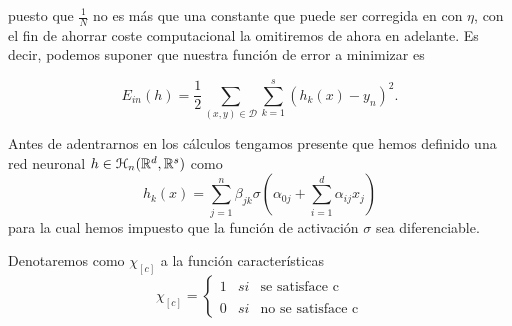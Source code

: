 puesto que $\frac{1}{N}$ no es más que una constante que 
puede ser corregida en  con $\eta$, con el fin de ahorrar coste computacional la 
omitiremos de ahora en adelante. Es decir, podemos suponer que 
nuestra función de error a minimizar es 

\begin{equation}
    E_{in}(h) = \frac{1}{2} \sum_{(x,y) \in \mathcal{D}} \sum_{k=1}^s (h_k(x)- y_n)^2. 
\end{equation}

Antes de adentrarnos en los cálculos tengamos presente que hemos definido una red neuronal  $h \in \mathcal{H}_n (\mathbb{R}^d, \mathbb{R}^s)$ como
\begin{equation}
    h_k(x) = 
    \sum_{j=1}^n \beta_{j k}
    \sigma
    \left(  
        \alpha_{0 j} +
        \sum_{i=1}^d \alpha_{i j}x_j
    \right)
\end{equation}
para la cual hemos impuesto que la función de activación $\sigma$ sea diferenciable.

Denotaremos como $\chi_{[c]}$ a la función características
\begin{equation}
    \chi_{[c]}= \left\{ \begin{array}{lcc}
        1 &   si  &  \text{se satisface c} \\
        \\ 0 &  si  & \text{no se satisface c} 
        \end{array}
\right.
\end{equation}

